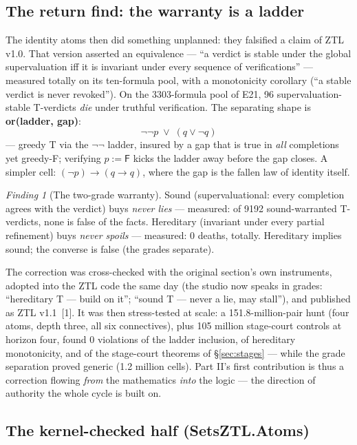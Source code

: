 \documentclass[11pt]{article}
\theoremstyle{remark}
\newtheorem{finding}[thm]{Finding}
\newcommand{\vT}{\textsf{T}}
\newcommand{\vF}{\textsf{F}}
\begin{document}
\subsection{The return find: the warranty is a ladder}
\label{sec:ladder}

The identity atoms then did something unplanned: they falsified a claim of
ZTL v1.0. That version asserted an equivalence --- ``a verdict is stable
under the global supervaluation iff it is invariant under every sequence of
verifications'' --- measured totally on its ten-formula pool, with a
monotonicity corollary (``a stable verdict is never revoked''). On the
3303-formula pool of E21, 96 supervaluation-stable \vT-verdicts \emph{die}
under truthful verification. The separating shape is
\textbf{or(ladder, gap)}:
\[
\lnot\lnot p \;\lor\; (q \lor \lnot q)
\]
--- greedy \vT{} via the $\lnot\lnot$ ladder, insured by a gap that is true
in \emph{all} completions yet greedy-\vF{}; verifying $p:=\vF$ kicks the
ladder away before the gap closes. A simpler cell: $(\lnot p) \to (q \to
q)$, where the gap is the fallen law of identity itself.

\begin{finding}[The two-grade warranty]
Sound (supervaluational: every completion agrees with the verdict) buys
\emph{never lies} --- measured: of 9192 sound-warranted \vT-verdicts, none
is false of the facts. Hereditary (invariant under every partial
refinement) buys \emph{never spoils} --- measured: 0 deaths, totally.
Hereditary implies sound; the converse is false (the grades separate).
\end{finding}

The correction was cross-checked with the original section's own
instruments, adopted into the ZTL code the same day (the studio now speaks
in grades: ``hereditary \vT{} --- build on it''; ``sound \vT{} --- never a
lie, may stall''), and published as ZTL v1.1~[1]. It was then
stress-tested at scale: a 151.8-million-pair hunt (four atoms, depth
three, all six connectives), plus 105 million stage-court controls at
horizon four, found 0 violations of the ladder inclusion, of hereditary
monotonicity, and of the stage-court theorems of
\S\ref{sec:stages} --- while the grade separation proved generic
(1.2 million cells). Part II's first
contribution is thus a correction flowing \emph{from} the mathematics
\emph{into} the logic --- the direction of authority the whole cycle is
built on.

\subsection{The kernel-checked half (\textsf{SetsZTL.Atoms})}
\end{document}
